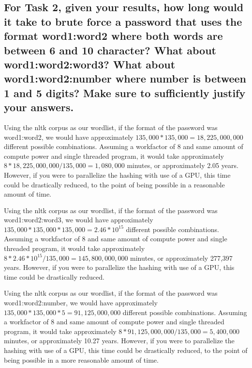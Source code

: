 \documentclass[11pt]{article}
\begin{document}
  \subsection{For Task 2, given your results, how long would it take to brute 
  force a password that uses the format word1:word2 where both words are
  between 6 and 10 character? What about word1:word2:word3? What about
  word1:word2:number where number is between 1 and 5 digits? Make sure to 
  sufficiently justify your answers.}
      Using the nltk corpus as our wordlist, if the format of the password 
      was word1:word2, we would have approximately $135,000 * 135,000 = 18,225,000,000$ different
      possible combinations. Assuming a workfactor of 8 and same amount of 
      compute power and single threaded program, it would take approximately
      $8*18,225,000,000/135,000 = 1,080,000$ minutes, or approximately 
      2.05 years. However, if you were to parallelize the hashing with 
      use of a GPU, this time could be drastically reduced, to the point of 
      being possible in a reasonable amount of time.

      Using the nltk corpus as our wordlist, if the format of the password 
      was word1:word2:word3, we would have approximately 
      $135,000 * 135,000 * 135,000= 2.46*10^{15}$ different
      possible combinations. Assuming a workfactor of 8 and same amount of 
      compute power and single threaded program, it would take approximately
      $8*2.46*10^{15}/135,000 = 145,800,000,000$ minutes, or approximately 
      277,397 years. However, if you were to parallelize the hashing with 
      use of a GPU, this time could be drastically reduced. 

      Using the nltk corpus as our wordlist, if the format of the password 
      was word1:word2:number, we would have approximately 
      $135,000 * 135,000 * 5 = 91,125,000,000$ different
      possible combinations. Assuming a workfactor of 8 and same amount of 
      compute power and single threaded program, it would take approximately
      $8*91,125,000,000/135,000 = 5,400,000$ minutes, or approximately 
      10.27 years. However, if you were to parallelize the hashing with 
      use of a GPU, this time could be drastically reduced, to the point of 
      being possible in a more reasonable amount of time.
\end{document}
